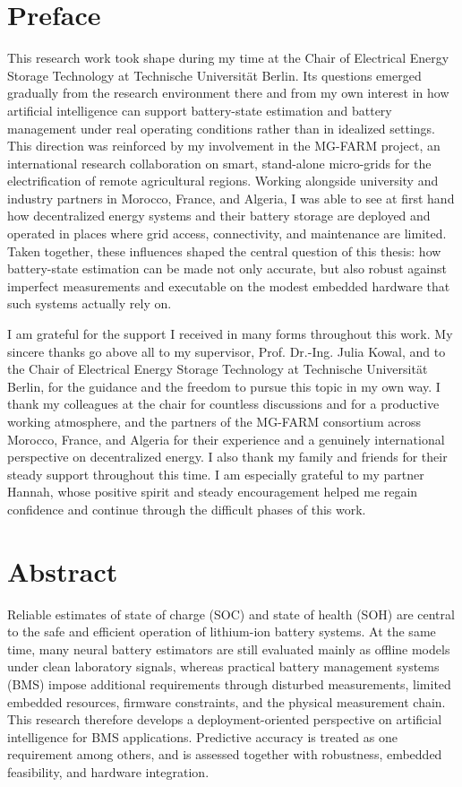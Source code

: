 \documentclass[
    a4paper,
    12pt,
    titlepage,
    bibliography=totoc,
    twoside=on,
    parskip=false,
    numbers=noenddot,
    cleardoublepage=empty,
    DIV=12,
    BCOR=12.0mm,
    headheight=36pt,
    headings=openright
]{scrreprt}
\begin{document}
\cleardoublepage
\chapter*{Preface}
This research work took shape during my time at the Chair of Electrical Energy Storage Technology at Technische Universit\"at Berlin. Its questions emerged gradually from the research environment there and from my own interest in how artificial intelligence can support battery-state estimation and battery management under real operating conditions rather than in idealized settings. This direction was reinforced by my involvement in the MG-FARM project, an international research collaboration on smart, stand-alone micro-grids for the electrification of remote agricultural regions. Working alongside university and industry partners in Morocco, France, and Algeria, I was able to see at first hand how decentralized energy systems and their battery storage are deployed and operated in places where grid access, connectivity, and maintenance are limited. Taken together, these influences shaped the central question of this thesis: how battery-state estimation can be made not only accurate, but also robust against imperfect measurements and executable on the modest embedded hardware that such systems actually rely on.

I am grateful for the support I received in many forms throughout this work. My sincere thanks go above all to my supervisor, Prof. Dr.-Ing. Julia Kowal, and to the Chair of Electrical Energy Storage Technology at Technische Universit\"at Berlin, for the guidance and the freedom to pursue this topic in my own way. I thank my colleagues at the chair for countless discussions and for a productive working atmosphere, and the partners of the MG-FARM consortium across Morocco, France, and Algeria for their experience and a genuinely international perspective on decentralized energy. I also thank my family and friends for their steady support throughout this time. I am especially grateful to my partner Hannah, whose positive spirit and steady encouragement helped me regain confidence and continue through the difficult phases of this work.

\chapter*{Abstract}
Reliable estimates of state of charge (SOC) and state of health (SOH) are central to the safe and efficient operation of lithium-ion battery systems. At the same time, many neural battery estimators are still evaluated mainly as offline models under clean laboratory signals, whereas practical battery management systems (BMS) impose additional requirements through disturbed measurements, limited embedded resources, firmware constraints, and the physical measurement chain. This research therefore develops a deployment-oriented perspective on artificial intelligence for BMS applications. Predictive accuracy is treated as one requirement among others, and is assessed together with robustness, embedded feasibility, and hardware integration.
\end{document}
